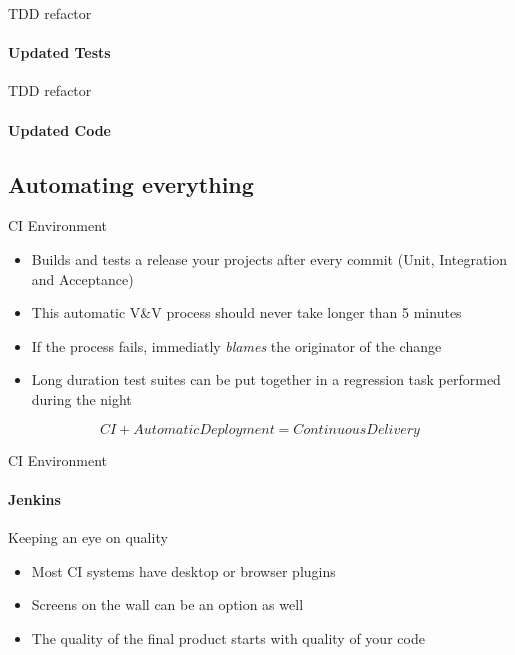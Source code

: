 \documentclass[aspectratio=169]{beamer}
\begin{document}
\begin{frame}{TDD refactor}
    \framesubtitle{Updated Tests}
    
\end{frame}

\begin{frame}{TDD refactor}
    \framesubtitle{Updated Code}
    
\end{frame}

\subsection*{Automating everything}
\label{automating_everything}

\begin{frame}{CI Environment}
    \begin{itemize}
    \item Builds and tests a release your projects after every commit (Unit, Integration and Acceptance)
    \item This automatic V\&V process should never take longer than 5 minutes
    \item If the process fails, immediatly \emph{blames} the originator of the change
    \item Long duration test suites can be put together in a regression task performed during the night
    \end{itemize}
    \begin{equation*}
    \boxed{CI + AutomaticDeployment = ContinuousDelivery}
    \end{equation*}
\end{frame}
\begin{frame}{CI Environment}
    \framesubtitle{Jenkins}
\end{frame}

\begin{frame}{Keeping an eye on quality}
    \begin{itemize}
    \item Most CI systems have desktop or browser plugins
    \pause
    \item Screens on the wall can be an option as well
    \pause
    \item The quality of the final product starts with quality of your code
    \end{itemize}
\end{frame}
\end{document}
